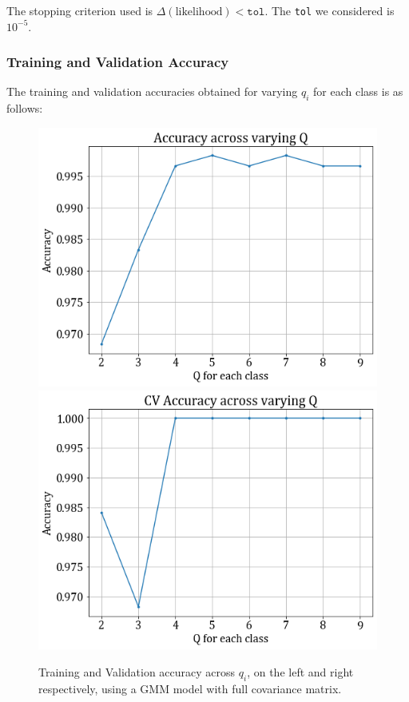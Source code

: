 \documentclass[11pt,a4paper]{article}
\newcommand{\noi}{\noindent}
\def\tt#1{\texttt{#1}}
\begin{document}
\noi
The stopping criterion used is $\Delta(\text{likelihood})<\tt{tol}$. The \tt{tol} we considered is $10^{-5}$.\\

\subsubsection{Training and Validation Accuracy}
The training and validation accuracies obtained for varying $q_i$ for each class is as follows:
\begin{figure}[H]
    \centering
    \hspace{-2em}
    \includegraphics[scale=0.45]{images/1B/1b_full_train.png}
    \includegraphics[scale=0.45]{images/1B/1b_full_val.png}
    \caption{Training and Validation accuracy across $q_i$, on the left and right respectively, using a GMM model with full covariance matrix.}
\end{figure}
\end{document}
